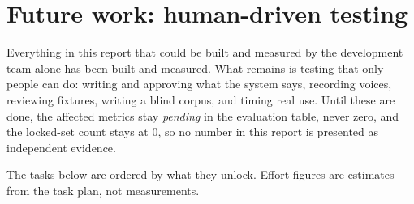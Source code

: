 \section{Future work: human-driven testing}\label{sec:humantesting}

Everything in this report that could be built and measured by the development team alone has been
built and measured. What remains is testing that only people can do: writing and approving what the
system says, recording voices, reviewing fixtures, writing a blind corpus, and timing real use. Until
these are done, the affected metrics stay \emph{pending} in the evaluation table, never zero, and the
locked-set count stays at 0, so no number in this report is presented as independent evidence.

The tasks below are ordered by what they unlock. Effort figures are estimates from the task plan, not
measurements.

